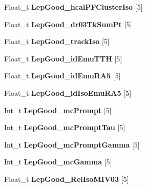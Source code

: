 \begin{DoxyCompactItemize}
\item 
\hypertarget{classMiniTree_a8ad56f765de0600c2a8e074fab9d6f9b}{}\label{classMiniTree_a8ad56f765de0600c2a8e074fab9d6f9b} 
Float\+\_\+t {\bfseries Lep\+Good\+\_\+hcal\+P\+F\+Cluster\+Iso} \mbox{[}5\mbox{]}
\item 
\hypertarget{classMiniTree_af2991175ccc7f39c35b93d2099d0ddcd}{}\label{classMiniTree_af2991175ccc7f39c35b93d2099d0ddcd} 
Float\+\_\+t {\bfseries Lep\+Good\+\_\+dr03\+Tk\+Sum\+Pt} \mbox{[}5\mbox{]}
\item 
\hypertarget{classMiniTree_a3667e29a32c05a9a03b4f4a77ba77c46}{}\label{classMiniTree_a3667e29a32c05a9a03b4f4a77ba77c46} 
Float\+\_\+t {\bfseries Lep\+Good\+\_\+track\+Iso} \mbox{[}5\mbox{]}
\item 
\hypertarget{classMiniTree_af5c60be57b9f8f44f2abd8e1d6817e33}{}\label{classMiniTree_af5c60be57b9f8f44f2abd8e1d6817e33} 
Float\+\_\+t {\bfseries Lep\+Good\+\_\+id\+Emu\+T\+TH} \mbox{[}5\mbox{]}
\item 
\hypertarget{classMiniTree_ad3b212f37b4456a6ebe150187a8d482c}{}\label{classMiniTree_ad3b212f37b4456a6ebe150187a8d482c} 
Float\+\_\+t {\bfseries Lep\+Good\+\_\+id\+Emu\+R\+A5} \mbox{[}5\mbox{]}
\item 
\hypertarget{classMiniTree_a9246867a7741816d86e3f5a8c8123889}{}\label{classMiniTree_a9246867a7741816d86e3f5a8c8123889} 
Float\+\_\+t {\bfseries Lep\+Good\+\_\+id\+Iso\+Emu\+R\+A5} \mbox{[}5\mbox{]}
\item 
\hypertarget{classMiniTree_a011df01688e31a3ba2910b0819f4b220}{}\label{classMiniTree_a011df01688e31a3ba2910b0819f4b220} 
Int\+\_\+t {\bfseries Lep\+Good\+\_\+mc\+Prompt} \mbox{[}5\mbox{]}
\item 
\hypertarget{classMiniTree_a94f88aaf4ee46052a22a64c6e330cffe}{}\label{classMiniTree_a94f88aaf4ee46052a22a64c6e330cffe} 
Int\+\_\+t {\bfseries Lep\+Good\+\_\+mc\+Prompt\+Tau} \mbox{[}5\mbox{]}
\item 
\hypertarget{classMiniTree_ac34f11808db4eccbf400e256c813fec5}{}\label{classMiniTree_ac34f11808db4eccbf400e256c813fec5} 
Int\+\_\+t {\bfseries Lep\+Good\+\_\+mc\+Prompt\+Gamma} \mbox{[}5\mbox{]}
\item 
\hypertarget{classMiniTree_ac4a8fc9bf9cd3abee2657e4ef3d6e381}{}\label{classMiniTree_ac4a8fc9bf9cd3abee2657e4ef3d6e381} 
Int\+\_\+t {\bfseries Lep\+Good\+\_\+mc\+Gamma} \mbox{[}5\mbox{]}
\item 
\hypertarget{classMiniTree_a5eabd20941d46cad03431b3588dd6924}{}\label{classMiniTree_a5eabd20941d46cad03431b3588dd6924} 
Float\+\_\+t {\bfseries Lep\+Good\+\_\+\+Rel\+Iso\+M\+I\+V03} \mbox{[}5\mbox{]}

\end{DoxyCompactItemize}

